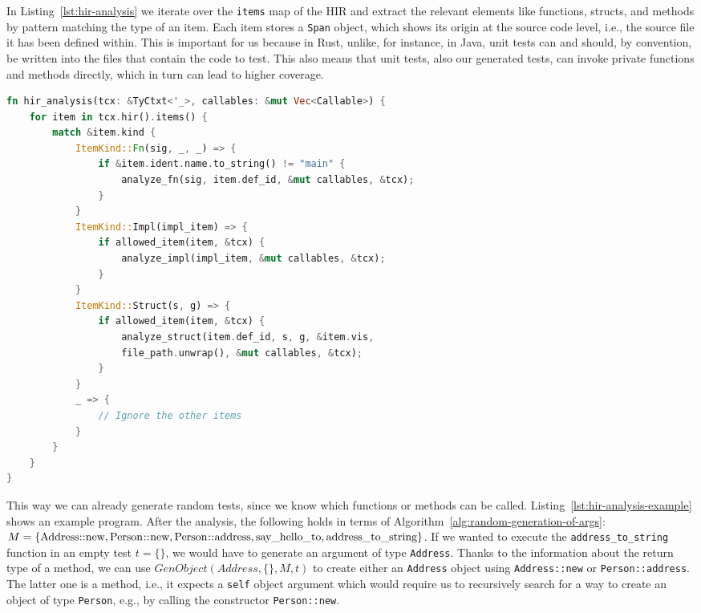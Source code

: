 \documentclass{article}
\begin{document}
In Listing~\ref{lst:hir-analysis} we iterate over the \lstinline{items} map of the \ac{HIR} and extract the relevant elements like functions, structs, and methods by pattern matching the type of an item. Each item stores a \lstinline{Span} object, which shows its origin at the source code level, i.e., the source file it has been defined within. This is important for us because in Rust, unlike, for instance, in Java, unit tests can and should, by convention, be written into the files that contain the code to test. This also means that unit tests, also our generated tests, can invoke private functions and methods directly, which in turn can lead to higher coverage. 

\begin{lstlisting}[language=Rust, style=boxed, caption={Iterate over the items in the HIR of a crate}, label=lst:hir-analysis]
fn hir_analysis(tcx: &TyCtxt<'_>, callables: &mut Vec<Callable>) {
    for item in tcx.hir().items() {
        match &item.kind {
            ItemKind::Fn(sig, _, _) => {
                if &item.ident.name.to_string() != "main" {
                    analyze_fn(sig, item.def_id, &mut callables, &tcx);
                }
            }
            ItemKind::Impl(impl_item) => {
                if allowed_item(item, &tcx) {
                    analyze_impl(impl_item, &mut callables, &tcx);
                }
            }
            ItemKind::Struct(s, g) => {
                if allowed_item(item, &tcx) {
                    analyze_struct(item.def_id, s, g, &item.vis,
                    file_path.unwrap(), &mut callables, &tcx);
                }
            }
            _ => {
                // Ignore the other items
            }
        }
    }
}
\end{lstlisting}

This way we can already generate random tests, since we know which functions or methods can be called. Listing~\ref{lst:hir-analysis-example} shows an example program. After the analysis, the following holds in terms of Algorithm~\ref{alg:random-generation-of-args}: $M = \{\lstinline{Address::new}, \lstinline{Person::new}, \lstinline{Person::address}, \lstinline{say_hello_to}, \lstinline{address_to_string}\}$. If we wanted to execute the \lstinline{address_to_string} function in an empty test $t = \{\}$, we would have to generate an argument of type \lstinline{Address}. Thanks to the information about the return type of a method, we can use $GenObject(Address, \{\}, M, t)$ to create either an \lstinline{Address} object using \lstinline{Address::new} or \lstinline{Person::address}. The latter one is a method, i.e., it expects a \lstinline{self} object argument which would require us to recursively search for a way to create an object of type \lstinline{Person}, e.g., by calling the constructor \lstinline{Person::new}.
\end{document}
